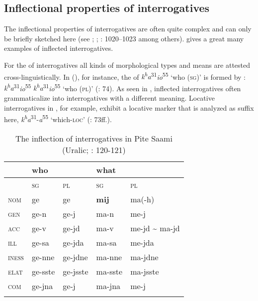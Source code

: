 \subsection{Inflectional properties of interrogatives}\label{sec:4.3.4}

The inflectional properties of interrogatives are often quite complex and can only be briefly sketched here (see \citealt{Mushin1995}; \citealt{Nau1999}; \citealt{Siemund2001}: 1020–1023 among others).  gives a great many examples of inflected interrogatives.

For the  of interrogatives all kinds of morphological types and means are attested cross-linguistically. In  (), for instance, the  of \textit{k\textsuperscript{h}}\textit{a}\textsuperscript{31}\textit{io}\textsuperscript{55} ‘who (\textsc{sg})’ is formed by : \textit{k\textsuperscript{h}}\textit{a}\textsuperscript{31}\textit{io}\textsuperscript{55} \textit{k\textsuperscript{h}}\textit{a}\textsuperscript{31}\textit{io}\textsuperscript{55} ‘who (\textsc{pl})’ (\citealt{SunHongkai2009}: 74). As seen in , inflected interrogatives often grammaticalize into interrogatives with a different meaning. Locative interrogatives in , for example, exhibit a locative marker that is analyzed as suffix here, \textit{k\textsuperscript{h}}\textit{a}\textsuperscript{31}-\textit{a}\textsuperscript{55} ‘which-\textsc{loc}’ (\citealt{SunHongkai2009}: 73ff.).

\begin{table}
\caption{The inflection of interrogatives in Pite Saami (Uralic; \citealt{Wilbur2014}: 120-121)}
\label{tab:4:13}

\begin{tabularx}{.8\textwidth}{XlXll}
\lsptoprule
& who &  & what & \\
\midrule
& \textsc{sg} & \textsc{pl} & \textsc{sg} & \textsc{pl}\\
\midrule
\textsc{nom} & ge & ge & \textbf{mij} & ma(-h)\\
\textsc{gen} & ge-n & ge-j & ma-n & me-j\\
\textsc{acc} & ge-v & ge-jd & ma-v & me-jd {\textasciitilde} ma-jd\\
\textsc{ill} & ge-sa & ge-jda & ma-sa & me-jda\\
\textsc{iness} & ge-nne & ge-jdne & ma-nne & ma-jdne\\
\textsc{elat} & ge-sste & ge-jsste & ma-sste & ma-jsste\\
\textsc{com} & ge-jna & ge-j & ma-jna & me-j\\
\lspbottomrule
\end{tabularx}
\end{table}

